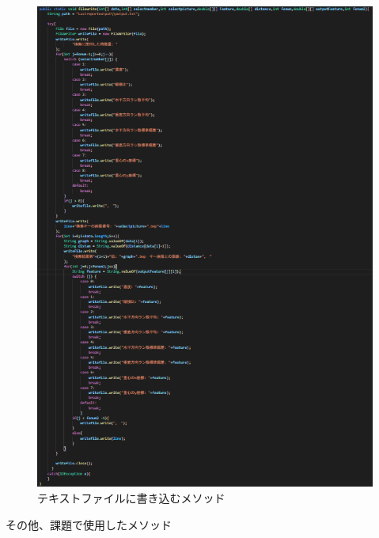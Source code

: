 \begin{enumerate}
\begin{itemize}
\begin{figure}[htbp]
\begin{minipage}[t]{\hsize}
        \includegraphics[scale=0.6]{テキストファイルに書き込む.PNG}
        \centering
        \caption{テキストファイルに書き込むメソッド\cite{url1}}
        \label{graph:22}
      \end{minipage}
    \end{figure}
  \end{itemize}
\end{enumerate}
\clearpage
その他、課題で使用したメソッド
